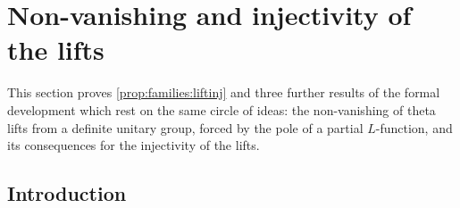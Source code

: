 \section{Non-vanishing and injectivity of the lifts}\label{sec:pf:liftinj}

\providecommand{\liftinjstr}{\operatorname{str}}
\providecommand{\liftinjX}{\mathbb{X}}
\providecommand{\liftinjLS}{L^{S}_{\mathrm{tw}}}
\providecommand{\liftinjres}{\operatorname{cf}}
\providecommand{\liftinjcut}{\mathcal{C}}
\providecommand{\liftinjup}{\Theta}
\providecommand{\liftinjP}[1]{\mathrm{#1}}

This section proves \cref{prop:families:liftinj} and three further results of the formal development which
rest on the same circle of ideas: the non-vanishing of theta lifts from a definite unitary group, forced by the
pole of a partial $L$-function, and its consequences for the injectivity of the lifts.

\subsection{Introduction}\label{sec:pf:liftinj:intro}

